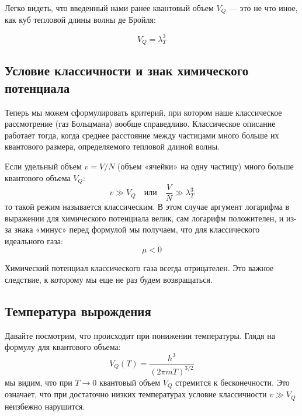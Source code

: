 \documentclass[../general/general]{subfiles}
\begin{document}
Легко видеть, что введенный нами ранее квантовый объем $V_Q$ — это не что иное, как куб тепловой длины волны де Бройля:

\begin{equation}
V_Q = \lambda_T^3
\end{equation}


\subsection{Условие классичности и знак химического потенциала}

Теперь мы можем сформулировать критерий, при котором наше классическое рассмотрение (газ Больцмана) вообще справедливо. Классическое описание работает тогда, когда среднее расстояние между частицами много больше их квантового размера, определяемого тепловой длиной волны.

Если удельный объем $v = V/N$ (объем «ячейки» на одну частицу) много больше квантового объема $V_Q$:
\begin{equation}
v \gg V_Q \quad \text{или} \quad \frac{V}{N} \gg \lambda_T^3
\end{equation}
то такой режим называется классическим. В этом случае аргумент логарифма в выражении для химического потенциала велик, сам логарифм положителен, и из-за знака «минус» перед формулой мы получаем, что для классического идеального газа:
\begin{equation}
\mu < 0
\end{equation}

Химический потенциал классического газа всегда отрицателен. Это важное следствие, к которому мы еще не раз будем возвращаться.

\subsection{Температура вырождения}

Давайте посмотрим, что происходит при понижении температуры. Глядя на формулу для квантового объема:
\begin{equation}
V_Q(T) = \frac{h^3}{(2\pi m T)^{3/2}}
\end{equation}
мы видим, что при $T \to 0$ квантовый объем $V_Q$ стремится к бесконечности. Это означает, что при достаточно низких температурах условие классичности $v \gg V_Q$ неизбежно нарушится.
\end{document}
